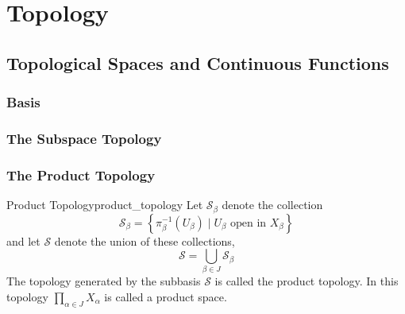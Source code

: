 
\chapter{Topology}

\section{Topological Spaces and Continuous Functions}







\subsection{Basis}

















\subsection{The Subspace Topology}



\subsection{The Product Topology}


\begin{definition}{Product Topology}{product_topology}
    Let $\mathcal{S}_{\beta}$ denote the collection
    \[
    \mathcal{ S } _{\beta}=\left\{\pi_{\beta}^{-1}\left(U_{\beta}\right) \mid U_{\beta} \text { open in } X_{\beta}\right\}
    \]
    and let $\mathcal{ S } $ denote the union of these collections,
    \[
    \mathcal{S}=\bigcup_{\beta \in J} \mathcal{S}_{\beta}
    \]
    The topology generated by the subbasis $\mathcal{ S } $ is called the product topology. In this topology $\prod_{\alpha \in J} X_{\alpha}$ is called a product space.
\end{definition}


